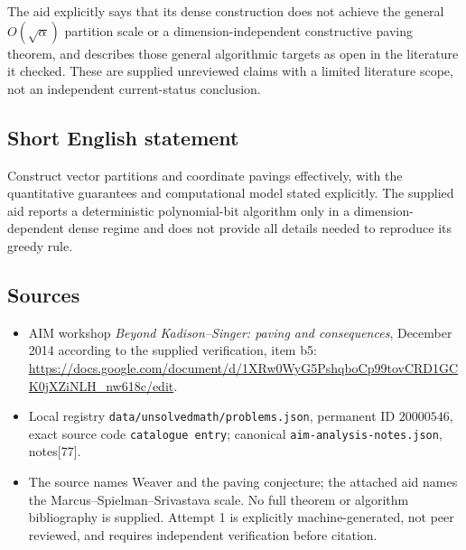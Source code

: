\documentclass[11pt]{article}
\begin{document}
The aid explicitly says that its dense construction does not achieve the general \(O(\sqrt\alpha)\) partition scale or a dimension-independent constructive paving theorem, and describes those general algorithmic targets as open in the literature it checked. These are supplied unreviewed claims with a limited literature scope, not an independent current-status conclusion.
\subsection{Short English statement}
Construct vector partitions and coordinate pavings effectively, with the quantitative guarantees and computational model stated explicitly. The supplied aid reports a deterministic polynomial-bit algorithm only in a dimension-dependent dense regime and does not provide all details needed to reproduce its greedy rule.
\subsection{Sources}
\begin{itemize}
\item AIM workshop \emph{Beyond Kadison--Singer: paving and consequences}, December 2014 according to the supplied verification, item b5: \url{https://docs.google.com/document/d/1XRw0WyG5PshqboCp99tovCRD1GCK0jXZiNLH_nw618c/edit}.
\item Local registry \texttt{data/unsolvedmath/problems.json}, permanent ID \(20000546\), exact source code \texttt{catalogue entry}; canonical \texttt{aim-analysis-notes.json}, notes[77].
\item The source names Weaver and the paving conjecture; the attached aid names the Marcus--Spielman--Srivastava scale. No full theorem or algorithm bibliography is supplied. Attempt 1 is explicitly machine-generated, not peer reviewed, and requires independent verification before citation.
\end{itemize}
\end{document}

